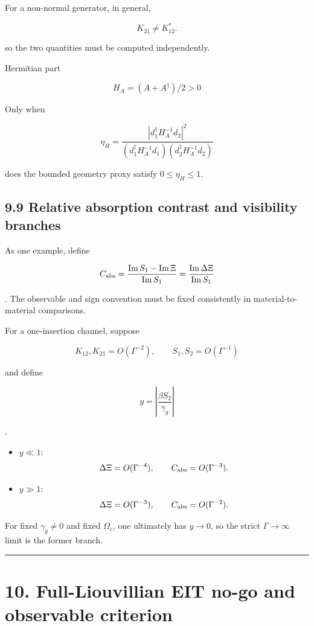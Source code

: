 \documentclass[
  10pt,
  a4paper,
]{article}
\providecommand{\tightlist}{%
  \setlength{\itemsep}{0pt}\setlength{\parskip}{0pt}}
\begin{document}
For a non-normal generator, in general,

\[
K_{21}\neq K_{12}^*.
\]

so the two quantities must be computed independently.

Hermitian part

\[
H_A=(A+A^\dagger)/2>0
\]

Only when

\[
\eta_H=
\frac{|d_1^\dagger H_A^{-1}d_2|^2}
{(d_1^\dagger H_A^{-1}d_1)
(d_2^\dagger H_A^{-1}d_2)}
\]

does the bounded geometry proxy satisfy \(0\le\eta_H\le1\).

\subsection{9.9 Relative absorption contrast and visibility
branches}\label{relative-absorption-contrast-and-visibility-branches}

As one example, define

\[
C_{\rm abs}
=\frac{\operatorname{Im}S_1-
\operatorname{Im}\Xi}
{\operatorname{Im}S_1}
=\frac{\operatorname{Im}\Delta\Xi}
{\operatorname{Im}S_1}
\]

. The observable and sign convention must be fixed consistently in
material-to-material comparisons.

For a one-insertion channel, suppose

\[
K_{12},K_{21}=O(\Gamma^{-2}),
\qquad
S_1,S_2=O(\Gamma^{-1})
\]

and define

\[
y=\left|\frac{\beta S_2}{\gamma_g}\right|
\]

.

\begin{itemize}
\tightlist
\item
  \(y\ll1\): \[
  \Delta\Xi=O(\Gamma^{-4}),
  \qquad
  C_{\rm abs}=O(\Gamma^{-3}).
  \]
\item
  \(y\gg1\): \[
  \Delta\Xi=O(\Gamma^{-3}),
  \qquad
  C_{\rm abs}=O(\Gamma^{-2}).
  \]
\end{itemize}

For fixed \(\gamma_g\neq0\) and fixed \(\Omega_c\), one ultimately has
\(y\to0\), so the strict \(\Gamma\to\infty\) limit is the former branch.

\begin{center}\rule{0.5\linewidth}{0.5pt}\end{center}

\section{10. Full-Liouvillian EIT no-go and observable
criterion}\label{full-liouvillian-eit-no-go-and-observable-criterion}
\end{document}
